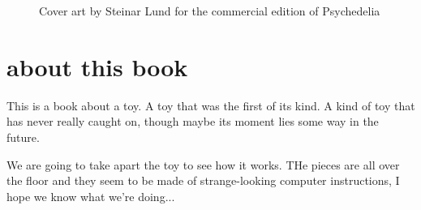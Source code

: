 \begin{figure}[H]
    \centering
    \begin{adjustbox}{width=12cm,center}
    \end{adjustbox}
\caption{Cover art by Steinar Lund for the commercial edition of Psychedelia}
\end{figure}
\clearpage
\chapter*{about this book} 
This is a book about a toy. A toy that was the first of its kind. A kind of toy that has never really caught on,
though maybe its moment lies some way in the future. 

We are going to take apart the toy to see how it works. THe pieces are all over the floor and they seem to be made
of strange-looking computer instructions, I hope we know what we're doing...


